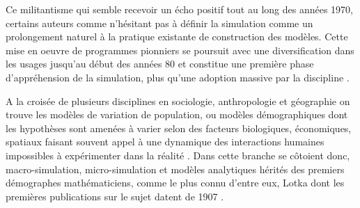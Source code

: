 Ce militantisme qui semble recevoir un écho positif tout au long des années 1970, certains auteurs comme \textcite[38]{Whallon1972} n'hésitant pas à définir la simulation comme un prolongement naturel à la pratique existante de construction des modèles. Cette mise en oeuvre de programmes pionniers se poursuit avec une diversification dans les usages jusqu'au début des années 80 et constitue une première phase d'appréhension de la simulation, plus qu'une adoption massive par la discipline \autocite{Lake2013}.



A la croisée de plusieurs disciplines en sociologie, anthropologie et géographie on trouve les modèles de variation de population, ou modèles démographiques dont les hypothèses sont amenées à varier selon des facteurs biologiques, économiques, spatiaux faisant souvent appel à une dynamique des interactions humaines impossibles à expérimenter dans la réalité . Dans cette branche se côtoient donc, macro-simulation, micro-simulation et modèles analytiques hérités des premiers démographes mathématiciens, comme le plus connu d'entre eux, Lotka dont les premières publications sur le sujet datent de 1907 \autocite[355]{Veron2009}.


